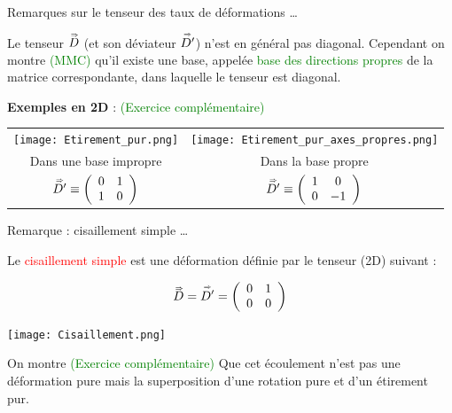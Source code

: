 \begin{frame}{Remarques sur le tenseur des taux de déformations  \ldots}
\small

Le tenseur $\accentset{\Rightarrow}{D}$ (et son déviateur $\accentset{\Rightarrow}{D'}$) n'est en général pas diagonal.
Cependant on montre \textcolor{green}{(MMC)} qu'il existe une base, appelée \textcolor{green}{base des directions propres} de la matrice correspondante, dans laquelle le tenseur est diagonal.

\medskip
\pause
{\bf Exemples en 2D } :   \textcolor{green}{(Exercice complémentaire)}
 
\begin{center}
\begin{tabular}{cc}
	\texttt{[image: Etirement\_pur.png]}
	&
	\texttt{[image: Etirement\_pur\_axes\_propres.png]}\\
	Dans une base impropre
	& Dans la base propre 
	\\
	$\accentset{\Rightarrow}{D'} \equiv  \left(
\begin{array}{cc}
		0 & 1 
		\\
		1 & 0 
	\end{array}
	\right)
	$ & 
	$\accentset{\Rightarrow}{D'} \equiv  \left(
\begin{array}{cc}
		1 & 0 
		\\
		0 & -1 
	\end{array}
	\right)
	$
\end{tabular}
\end{center}


\end{frame}



\begin{frame}{Remarque : cisaillement simple  \ldots}
\small

Le \textcolor{red}{cisaillement simple } est une déformation définie par le tenseur (2D) suivant :

\[
\accentset{\Rightarrow}{D} = \accentset{\Rightarrow}{D'} = 
	\left(
	\begin{array}{cc}
		0 & 1 
		\\
		0 & 0
	\end{array}
	\right)
\]

\bigskip

\begin{center}
	\texttt{[image: Cisaillement.png]}
\end{center}

\pause

\bigskip 
On montre \textcolor{green}{(Exercice complémentaire)} Que cet écoulement n'est pas une déformation pure mais la superposition d'une rotation pure et d'un étirement pur.

\end{frame}


